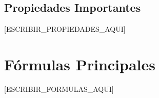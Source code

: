 \begin{teoria}

% 

\subsection{Propiedades Importantes}

[ESCRIBIR_PROPIEDADES_AQUI]

% 
% 
% 


\section{Fórmulas Principales}

[ESCRIBIR_FORMULAS_AQUI]




\end{teoria}
